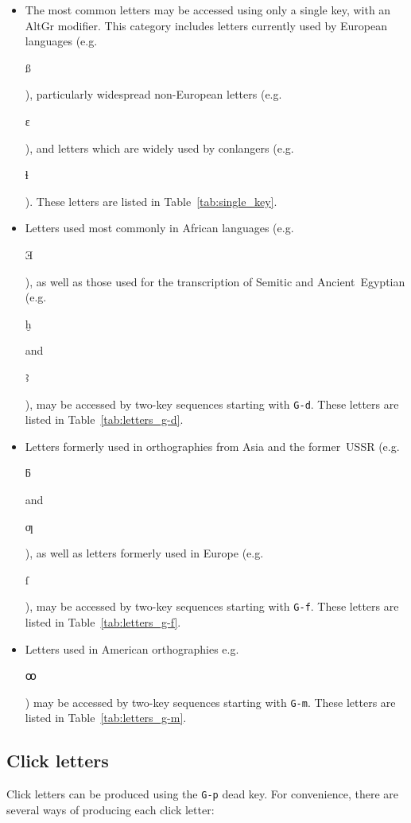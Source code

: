 \documentclass[oneside]{memoir}
\newcommand{\key}{\verb}
\newcommand{\out}[1]{\colorbox{gray!20}{\strut{}#1}}
\begin{document}
\begin{itemize}
\item
  The most common letters may be accessed using only a single key, with an AltGr modifier.
  This category includes letters currently used by European languages (e.g.~\out{ß}),
    particularly widespread non-European letters (e.g.~\out{ɛ}),
    and letters which are widely used by conlangers (e.g.~\out{ɬ}).
  These letters are listed in Table~\ref{tab:single_key}.
\item
  Letters used most commonly in African languages (e.g.~\out{Ǝ}),
    as well as those used for the transcription of Semitic and Ancient~Egyptian (e.g.~\out{ḫ} and~\out{ꜣ}),
    may be accessed by two-key sequences starting with \key|G-d|.
  These letters are listed in Table~\ref{tab:letters_g-d}.
\item
  Letters formerly used in orthographies from Asia and the former~USSR (e.g.~\out{ƃ} and~\out{ƣ}),
    as well as letters formerly used in Europe (e.g.~\out{ſ}),
    may be accessed by two-key sequences starting with \key|G-f|.
  These letters are listed in Table~\ref{tab:letters_g-f}.
\item
  Letters used in American orthographies e.g.~\out{ꝏ})
    may be accessed by two-key sequences starting with \key|G-m|.
  These letters are listed in Table~\ref{tab:letters_g-m}.
\end{itemize}



\subsection{Click letters}
\label{sec:clicks}

Click letters can be produced using the \key|G-p| dead key.
For convenience, there are several ways of producing each click letter:
\end{document}
